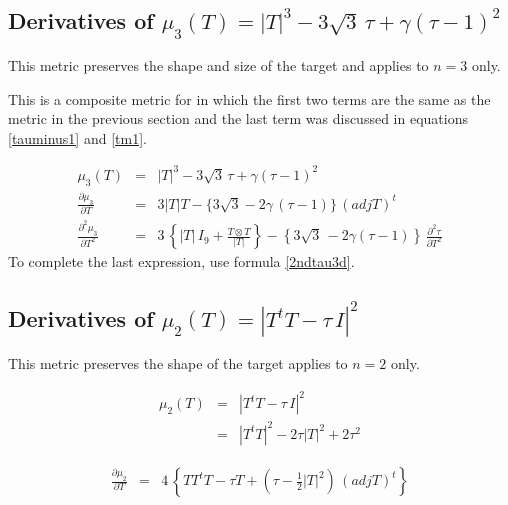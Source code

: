 \documentclass{report}
\begin{document}
\subsection{Derivatives of $\mu_3(T) = |T|^3 - 3 \sqrt{3} \, \tau + \gamma (\tau-1)^2$}

\noindent This metric preserves the shape and size of the target and applies
to $n=3$ only. \newline

\noindent This is a composite metric for in which the first two terms are the 
same as the metric in the previous section and the last term was discussed
in equations \ref{tauminus1} and \ref{tm1}. \newline 

\begin{eqnarray}
\mu_3 (T) & = & |T|^3 - 3 \sqrt{3} \, \tau + \gamma (\tau-1)^2 \\
\frac{\partial \mu_3}{\partial T} & = & 3 |T| T - \{ 3 \sqrt{3} - 2 \gamma \, (\tau-1) \}  \, (adj T)^t \\
\frac{\partial^2 \mu_3}{\partial T^2} & = & 3 \, \left\{ |T| \, I_9 + \frac{T \otimes T}{|T|} \right\} - \left\{ 3 \sqrt{3} \, - 2 \gamma (\tau-1) \right\} \, \frac{\partial^2 \tau}{\partial T^2}
\end{eqnarray}
To complete the last expression, use formula \ref{2ndtau3d}. \newline

\subsection{Derivatives of $\mu_2(T)=|T^t T - \tau \, I|^2$}

This metric preserves the shape of the target applies to $n=2$ only. \newline

\begin{eqnarray}
\mu_2 (T) & = & |T^t T - \tau \, I|^2 \\
          & = & |T^t T|^2 - 2 \tau |T|^2 + 2 \tau^2 \nonumber
\end{eqnarray}

\begin{eqnarray}
\frac{\partial \mu_2}{\partial T} & = & 4 \, \left\{ T T^t T - \tau T + \left( \tau - \frac{1}{2} |T|^2 \right) \, (adj T)^t \right\}
\end{eqnarray}
\end{document}
